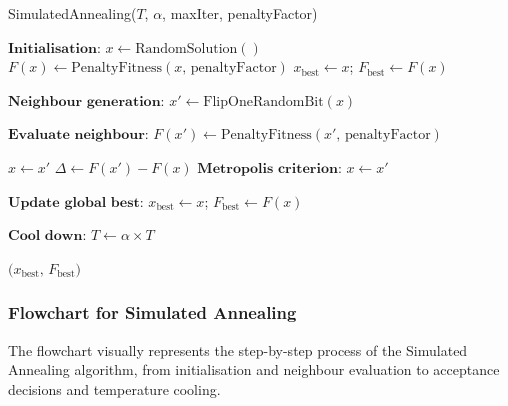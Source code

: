 \documentclass[12pt]{article}
\begin{document}
\vspace{1em}
\begin{algorithm}[htbp]
  \caption{SimulatedAnnealing(\(T\), \(\alpha\), maxIter, penaltyFactor)}
  \label{alg:simulated_annealing}
  \begin{algorithmic}[1]
    \State \(\textbf{Initialisation:}\)
    \State \(x \gets \text{RandomSolution}()\) 
    \State \(F(x) \gets \text{PenaltyFitness}(x,\, \text{penaltyFactor})\) 
    \State \(x_{\text{best}} \gets x\); \quad \(F_{\text{best}} \gets F(x)\)

      \State \(\textbf{Neighbour generation:}\)
      \State \(x' \gets \text{FlipOneRandomBit}(x)\) 

      \State \(\textbf{Evaluate neighbour:}\)
      \State \(F(x') \gets \text{PenaltyFitness}(x',\, \text{penaltyFactor})\)

        \State \(x \gets x'\) 
      \Else
        \State \(\Delta \gets F(x') - F(x)\)
        \State \(\textbf{Metropolis criterion:}\)
          \State \(x \gets x'\) 
        \EndIf
      \EndIf

      \State \(\textbf{Update global best:}\)
        \State \(x_{\text{best}} \gets x\); \quad \(F_{\text{best}} \gets F(x)\)
      \EndIf

      \State \(\textbf{Cool down:}\)
      \State \(T \gets \alpha \times T\)
    \EndFor
    
    \State \Return \(\bigl(x_{\text{best}},\, F_{\text{best}}\bigr)\)
  \end{algorithmic}
\end{algorithm}

\subsubsection{Flowchart for Simulated Annealing}
The flowchart visually represents the step-by-step process of the Simulated Annealing algorithm, from initialisation and neighbour evaluation to acceptance decisions and temperature cooling.
\end{document}
